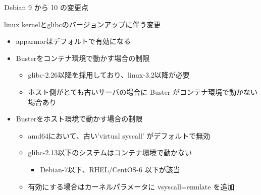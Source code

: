 \begin{frame}{Debian 9 から 10 の変更点}%

linux kernelとglibcのバージョンアップに伴う変更
  
\begin{itemize}
\item apparmorはデフォルトで有効になる
\item Busterをコンテナ環境で動かす場合の制限
  \begin{itemize}
  \item glibc-2.26以降を採用しており、linux-3.2以降が必要
  \item ホスト側がとても古いサーバの場合に Buster がコンテナ環境で動かない場合あり
  \end{itemize}
\item Busterをホスト環境で動かす場合の制限
  \begin{itemize}
  \item amd64において、古い'virtual syscall' がデフォルトで無効
  \item glibc-2.13以下のシステムはコンテナ環境で動かない
    \begin{itemize}
    \item Debian-7以下、RHEL/CentOS-6 以下が該当
    \end{itemize}
  \item 有効にする場合はカーネルパラメータに vsyscall=emulate を追加
  \end{itemize}
\end{itemize}

\end{frame}


